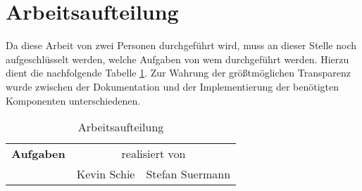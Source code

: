 \section{Arbeitsaufteilung}
\label{sec:Arbeitsaufteilung}
Da diese Arbeit von zwei Personen durchgeführt wird, muss an dieser Stelle noch aufgeschlüsselt werden, welche Aufgaben von wem durchgeführt werden. Hierzu dient die nachfolgende Tabelle \ref{tbl:arbeitsaufteilung}. Zur Wahrung der größtmöglichen Transparenz wurde zwischen der Dokumentation und der Implementierung der benötigten Komponenten unterschiedenen. 

\begin{table}[]
\caption{Arbeitsaufteilung}
\label{tbl:arbeitsaufteilung}
\begin{tabular}{|l|c|c|}
\hline
{\bf Aufgaben}                                                    & \multicolumn{2}{c|}{realisiert von}                                    \\
                                                                  & \multicolumn{1}{l|}{Kevin Schie} & \multicolumn{1}{l|}{Stefan Suermann} \\


\end{tabular}
\end{table}

